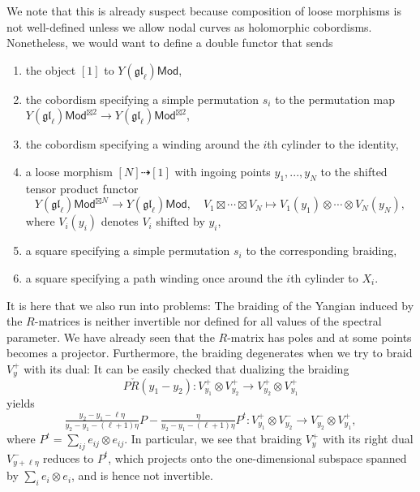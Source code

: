 \documentclass[11pt]{report}
\theoremstyle{definition}
\theoremstyle{remark}
\theoremstyle{remark}
\begin{document}
We note that this is already suspect because composition of loose morphisms is not well-defined unless we allow nodal curves as holomorphic cobordisms. Nonetheless, we would want to define a double functor that sends
\begin{enumerate}[label=(\roman*)]
\item the object $[1]$ to $Y(\mathfrak{gl}_\ell)\mathsf{Mod}$,
\item the cobordism specifying a simple permutation $s_i$ to the permutation map $Y(\mathfrak{gl}_\ell)\mathsf{Mod}^{\boxtimes 2} \to Y(\mathfrak{gl}_\ell)\mathsf{Mod}^{\boxtimes 2}$,
\item the cobordism specifying a winding around the $i$th cylinder to the identity,
\item a loose morphism $[N] \dashrightarrow [1]$ with ingoing points $y_1,...,y_N$ to the shifted tensor product functor
\begin{equation*}
Y(\mathfrak{gl}_\ell)\mathsf{Mod}^{\boxtimes N} \to Y(\mathfrak{gl}_\ell)\mathsf{Mod}, \quad V_1 \boxtimes \cdots \boxtimes V_N \mapsto V_1(y_1) \otimes \cdots \otimes V_N(y_N),
\end{equation*}
where $V_i(y_i)$ denotes $V_i$ shifted by $y_i$,
\item a square specifying a simple permutation $s_i$ to the corresponding braiding,
\item a square specifying a path winding once around the $i$th cylinder to $X_i$.
\end{enumerate}
It is here that we also run into problems: The braiding of the Yangian induced by the $R$-matrices is neither invertible nor defined for all values of the spectral parameter. We have already seen that the $R$-matrix has poles and at some points becomes a projector. Furthermore, the braiding degenerates when we try to braid $V_y^+$ with its dual: It can be easily checked that dualizing the braiding
\begin{equation*}
P \check R(y_1-y_2): V_{y_1}^+ \otimes V_{y_2}^+ \to V_{y_2}^+ \otimes V_{y_1}^+
\end{equation*}
yields
\begin{equation*}
\tfrac{y_2-y_1-\ell\eta}{y_2-y_1-(\ell+1)\eta} P - \tfrac{\eta}{y_2-y_1-(\ell+1)\eta} P^t: V_{y_1}^+ \otimes V_{y_2}^- \to V_{y_2}^- \otimes V_{y_1}^+,
\end{equation*}
where $P^t = \sum_{ij} e_{ij} \otimes e_{ij}$. In particular, we see that braiding $V_y^+$ with its right dual $V_{y+\ell\eta}^-$ reduces to $P^t$, which projects onto the one-dimensional subspace spanned by $\sum_i e_i \otimes e_i$, and is hence not invertible.
\end{document}
